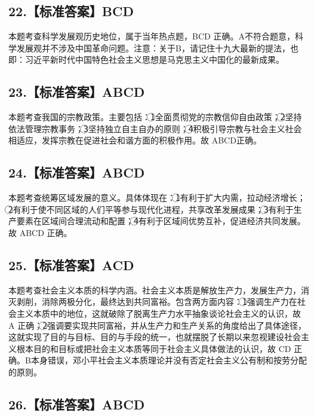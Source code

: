 \documentclass[UTF8,11pt]{ctexart}
\begin{document}
\subsection*{22.【标准答案】BCD}

本题考查科学发展观历史地位，属于当年热点题，BCD 正确。A不符合题意，科学发展观并不涉及中国革命问题。注意：关于B，请记住十九大最新的提法，也即：习近平新时代中国特色社会主义思想是马克思主义中国化的最新成果。


\subsection*{23.【标准答案】ABCD}

本题考查我国的宗教政策。主要包括：\textcircled{1}全面贯彻党的宗教信仰自由政策；\textcircled{2}坚持依法管理宗教事务；\textcircled{3}坚持独立自主自办的原则；\textcircled{4}积极引导宗教与社会主义社会相适应，发挥宗教在促进社会和谐方面的积极作用。故 ABCD正确。


\subsection*{24.【标准答案】ABCD}

本题考查统筹区域发展的意义。具体体现在：\textcircled{1}有利于扩大内需，拉动经济增长；\textcircled{2}有利于使不同区域的人们平等参与现代化进程，共享改革发展成果；\textcircled{3}有利于生产要素在区域间合理流动和配置；\textcircled{4}有利于区域间优势互补，促进经济共同发展。故 ABCD 正确。


\subsection*{25.【标准答案】ACD}

本题考查社会主义本质的科学内涵。社会主义本质是解放生产力，发展生产力，消灭剥削，消除两极分化，最终达到共同富裕。包含两方面内容：\textcircled{1}强调生产力在社会主义本质中的地位，这就破除了脱离生产力水平抽象谈论社会主义的认识，故 A 正确；\textcircled{2}强调要实现共同富裕，并从生产力和生产关系的角度给出了具体途径，这就实现了目的与目标、目的与手段的统一，也就摆脱了长期以来忽视建设社会主义根本目的和目标或把社会主义本质等同于社会主义具体做法的认识，故 CD 正确。B本身错误，邓小平社会主义本质理论并没有否定社会主义公有制和按劳分配的原则。


\subsection*{26.【标准答案】ABCD}
\end{document}
